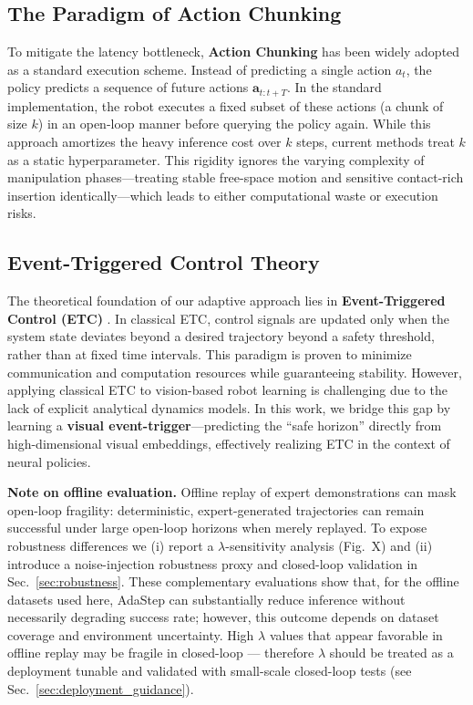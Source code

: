 \documentclass[conference]{IEEEtran}
\begin{document}
\subsection{The Paradigm of Action Chunking}
To mitigate the latency bottleneck, \textbf{Action Chunking} has been widely adopted as a standard execution scheme. Instead of predicting a single action $a_t$, the policy predicts a sequence of future actions $\mathbf{a}_{t:t+T}$. In the standard implementation, the robot executes a fixed subset of these actions (a chunk of size $k$) in an open-loop manner before querying the policy again.
While this approach amortizes the heavy inference cost over $k$ steps, current methods treat $k$ as a static hyperparameter. This rigidity ignores the varying complexity of manipulation phases---treating stable free-space motion and sensitive contact-rich insertion identically---which leads to either computational waste or execution risks.

\subsection{Event-Triggered Control Theory}
The theoretical foundation of our adaptive approach lies in \textbf{Event-Triggered Control (ETC)} \cite{heemels2012introduction}. In classical ETC, control signals are updated only when the system state deviates beyond a desired trajectory beyond a safety threshold, rather than at fixed time intervals. This paradigm is proven to minimize communication and computation resources while guaranteeing stability.
However, applying classical ETC to vision-based robot learning is challenging due to the lack of explicit analytical dynamics models. In this work, we bridge this gap by learning a \textbf{visual event-trigger}---predicting the ``safe horizon'' directly from high-dimensional visual embeddings, effectively realizing ETC in the context of neural policies.

\textbf{Note on offline evaluation.} Offline replay of expert demonstrations can mask open-loop fragility: deterministic, expert-generated trajectories can remain successful under large open-loop horizons when merely replayed. To expose robustness differences we (i) report a $\lambda$-sensitivity analysis (Fig.~X) and (ii) introduce a noise-injection robustness proxy and closed-loop validation in Sec.~\ref{sec:robustness}. These complementary evaluations show that, for the offline datasets used here, AdaStep can substantially reduce inference without necessarily degrading success rate; however, this outcome depends on dataset coverage and environment uncertainty. High $\lambda$ values that appear favorable in offline replay may be fragile in closed-loop — therefore $\lambda$ should be treated as a deployment tunable and validated with small-scale closed-loop tests (see Sec.~\ref{sec:deployment_guidance}).
\end{document}
